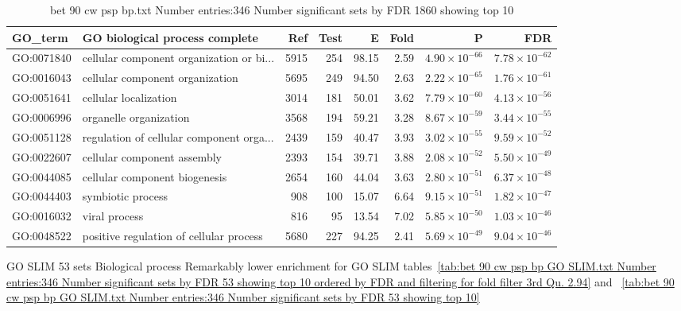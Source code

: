 \begin{table}[ht]
\centering
\begin{tabular}{llrrrrrr}
  \hline
GO\_term & GO biological process complete & Ref & Test & E & Fold & P & FDR \\ 
  \hline
GO:0071840 & cellular component organization or bi... & 5915 & 254 & 98.15 & 2.59 & $4.90 \times 10^{-66}$ & $7.78 \times 10^{-62}$ \\ 
  GO:0016043 & cellular component organization  & 5695 & 249 & 94.50 & 2.63 & $2.22 \times 10^{-65}$ & $1.76 \times 10^{-61}$ \\ 
  GO:0051641 & cellular localization  & 3014 & 181 & 50.01 & 3.62 & $7.79 \times 10^{-60}$ & $4.13 \times 10^{-56}$ \\ 
  GO:0006996 & organelle organization  & 3568 & 194 & 59.21 & 3.28 & $8.67 \times 10^{-59}$ & $3.44 \times 10^{-55}$ \\ 
  GO:0051128 & regulation of cellular component orga... & 2439 & 159 & 40.47 & 3.93 & $3.02 \times 10^{-55}$ & $9.59 \times 10^{-52}$ \\ 
  GO:0022607 & cellular component assembly  & 2393 & 154 & 39.71 & 3.88 & $2.08 \times 10^{-52}$ & $5.50 \times 10^{-49}$ \\ 
  GO:0044085 & cellular component biogenesis  & 2654 & 160 & 44.04 & 3.63 & $2.80 \times 10^{-51}$ & $6.37 \times 10^{-48}$ \\ 
  GO:0044403 & symbiotic process  & 908 & 100 & 15.07 & 6.64 & $9.15 \times 10^{-51}$ & $1.82 \times 10^{-47}$ \\ 
  GO:0016032 & viral process  & 816 & 95 & 13.54 & 7.02 & $5.85 \times 10^{-50}$ & $1.03 \times 10^{-46}$ \\ 
  GO:0048522 & positive regulation of cellular process  & 5680 & 227 & 94.25 & 2.41 & $5.69 \times 10^{-49}$ & $9.04 \times 10^{-46}$ \\ 
  \hline
\end{tabular}
\caption{bet 90 cw psp bp.txt Number entries:346 Number significant sets by FDR 1860 showing top 10} 
\label{tab:bet 90 cw psp bp.txt Number entries:346 Number significant sets by FDR 1860 showing top 10}
\end{table}

GO SLIM 53 sets Biological process
Remarkably lower enrichment for GO SLIM tables~\ref{tab:bet 90 cw psp bp GO SLIM.txt Number entries:346 Number significant sets by FDR 53 showing top 10 ordered by FDR and filtering for fold filter 3rd Qu. 2.94} and ~\ref{tab:bet 90 cw psp bp GO SLIM.txt Number entries:346 Number significant sets by FDR 53 showing top 10}

